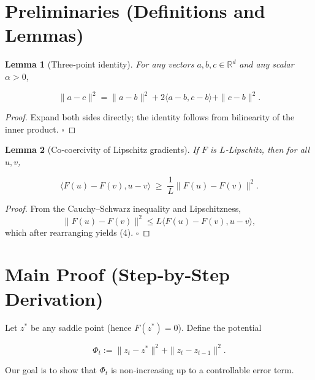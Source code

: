 \documentclass{article}
\newtheorem{lemma}{Lemma}
\newcommand{\R}{\mathbb{R}}
\begin{document}
\newpage
\section*{Preliminaries (Definitions and Lemmas)}
\begin{lemma}[Three‑point identity]\label{lem:three}
For any vectors \(a,b,c\in\R^{d}\) and any scalar \(\alpha>0\),

\[
\|a-c\|^{2}= \|a-b\|^{2}+2\langle a-b,c-b\rangle+\|c-b\|^{2}.
\tag{3}
\]
\end{lemma}
\begin{proof}
Expand both sides directly; the identity follows from bilinearity of the inner product. \(\square\)
\end{proof}

\begin{lemma}[Co‑coercivity of Lipschitz gradients]\label{lem:coerc}
If \(F\) is \(L\)-Lipschitz, then for all \(u,v\),

\[
\langle F(u)-F(v),u-v\rangle \;\ge\; \frac{1}{L}\|F(u)-F(v)\|^{2}.
\tag{4}
\]
\end{lemma}
\begin{proof}
From the Cauchy–Schwarz inequality and Lipschitzness,
\[
\|F(u)-F(v)\|^{2}\le L\langle F(u)-F(v),u-v\rangle,
\]
which after rearranging yields (4). \(\square\)
\end{proof}

\section*{Main Proof (Step‑by‑Step Derivation)}
Let \(z^{*}\) be any saddle point (hence \(F(z^{*})=0\)).  
Define the potential  

\[
\Phi_{t}:=\|z_{t}-z^{*}\|^{2}+\|z_{t}-z_{t-1}\|^{2}.
\tag{5}
\]

Our goal is to show that \(\Phi_{t}\) is non‑increasing up to a controllable error term.
\end{document}

